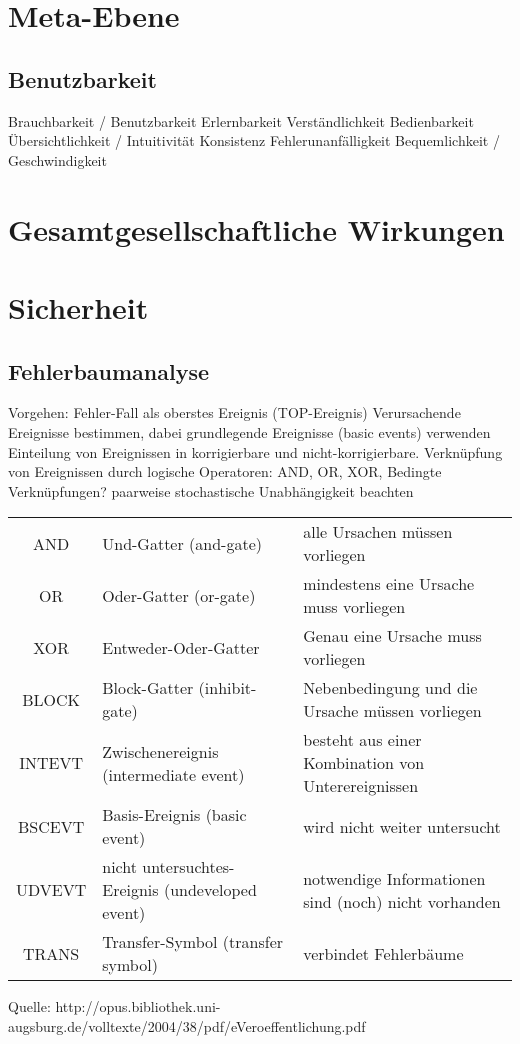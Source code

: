 %
%
%
\section{Meta-Ebene}
\subsection{Benutzbarkeit}

Brauchbarkeit / Benutzbarkeit
	Erlernbarkeit
	Verständlichkeit
	Bedienbarkeit
		Übersichtlichkeit / Intuitivität
		Konsistenz
		Fehlerunanfälligkeit
		Bequemlichkeit / Geschwindigkeit
%
%
%
\section{Gesamtgesellschaftliche Wirkungen}
%
%
%
\section{Sicherheit}

\subsection{Fehlerbaumanalyse}

Vorgehen:
Fehler-Fall als oberstes Ereignis (TOP-Ereignis)
Verursachende Ereignisse bestimmen, dabei
	grundlegende Ereignisse (basic events) verwenden
	Einteilung von Ereignissen in korrigierbare und nicht-korrigierbare.
	Verknüpfung von Ereignissen durch logische Operatoren:
		AND, OR, XOR, Bedingte Verknüpfungen?
	paarweise stochastische Unabhängigkeit beachten

\begin{tabular}{cll}
AND	& Und-Gatter (and-gate)
	& alle Ursachen müssen vorliegen\\
OR	& Oder-Gatter (or-gate)
	& mindestens eine Ursache muss vorliegen\\
XOR	& Entweder-Oder-Gatter
	& Genau eine Ursache muss vorliegen\\
BLOCK	& Block-Gatter (inhibit-gate)
	& Nebenbedingung und die Ursache müssen vorliegen\\
INTEVT	& Zwischenereignis (intermediate event)
	& besteht aus einer Kombination von Unterereignissen\\
BSCEVT	& Basis-Ereignis (basic event)
	& wird nicht weiter untersucht\\
UDVEVT	& nicht untersuchtes-Ereignis (undeveloped event)
	& notwendige Informationen sind (noch) nicht vorhanden\\
TRANS	& Transfer-Symbol (transfer symbol)
	& verbindet Fehlerbäume
\end{tabular}
Quelle: http://opus.bibliothek.uni-augsburg.de/volltexte/2004/38/pdf/eVeroeffentlichung.pdf
%
%
%
